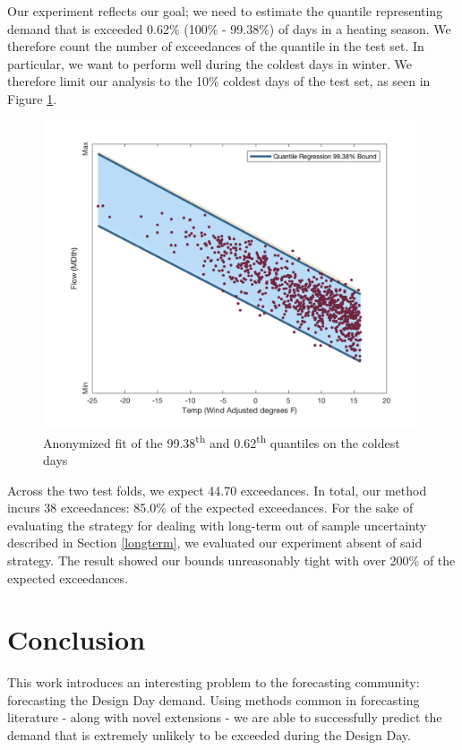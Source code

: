 \documentclass{article}
\begin{document}
Our experiment reflects our goal; we need to estimate the quantile representing demand that is exceeded 0.62\% (100\% - 99.38\%) of days in a heating season. We therefore count the number of exceedances of the quantile in the test set. In particular, we want to perform well during the coldest days in winter. We therefore limit our analysis to the 10\% coldest days of the test set, as seen in Figure \ref{qrResults}.
\begin{figure}
	\includegraphics[scale=0.3]{bienLab3.png}
	\caption{Anonymized fit of the 99.38\textsuperscript{th} and 0.62\textsuperscript{th} quantiles on the coldest days}\label{qrResults}
\end{figure}
 Across the two test folds, we expect 44.70 exceedances. In total, our method incurs 38 exceedances: 85.0\% of the expected exceedances. For the sake of evaluating the strategy for dealing with long-term out of sample uncertainty described in Section \ref{longterm}, we evaluated our experiment absent of said strategy. The result showed our bounds unreasonably tight with over 200\% of the expected exceedances.

\section{Conclusion}

This work introduces an interesting problem to the forecasting community: forecasting the Design Day demand. Using methods common in forecasting literature - along with novel extensions - we are able to successfully predict the demand that is extremely unlikely to be exceeded during the Design Day. 






\end{document}
